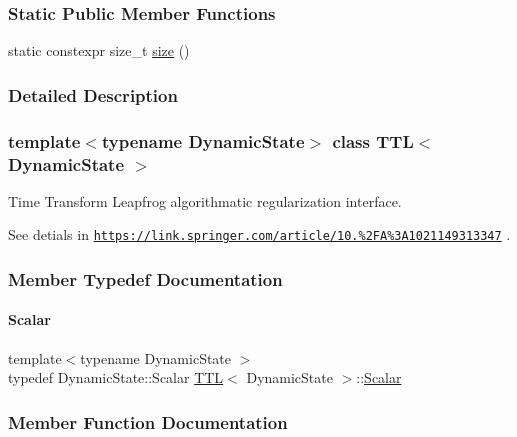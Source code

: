 \subsubsection*{Static Public Member Functions}
\begin{DoxyCompactItemize}
\item 
static constexpr size\+\_\+t \mbox{\hyperlink{class_t_t_l_afec8947e7c6c18561be42e3dea30a04d}{size}} ()
\end{DoxyCompactItemize}


\subsubsection{Detailed Description}
\subsubsection*{template$<$typename Dynamic\+State$>$\newline
class T\+T\+L$<$ Dynamic\+State $>$}

Time Transform Leapfrog algorithmatic regularization interface. 

See detials in \href{https://link.springer.com/article/10.1023%2FA%3A1021149313347}{\tt https\+://link.\+springer.\+com/article/10.\+1023\%2\+F\+A\%3\+A1021149313347} . 

\subsubsection{Member Typedef Documentation}
\mbox{\label{class_t_t_l_a7eb23a1fca47fc7b81e69cbd948059e9}} 
\paragraph{\texorpdfstring{Scalar}{Scalar}}
{\footnotesize\ttfamily template$<$typename Dynamic\+State $>$ \\
typedef Dynamic\+State\+::\+Scalar \mbox{\hyperlink{class_t_t_l}{T\+TL}}$<$ Dynamic\+State $>$\+::\mbox{\hyperlink{class_t_t_l_a7eb23a1fca47fc7b81e69cbd948059e9}{Scalar}}}



\subsubsection{Member Function Documentation}
\mbox{\label{class_t_t_l_aedc11109f6e3cfd30203abb74cd906a2}} 
